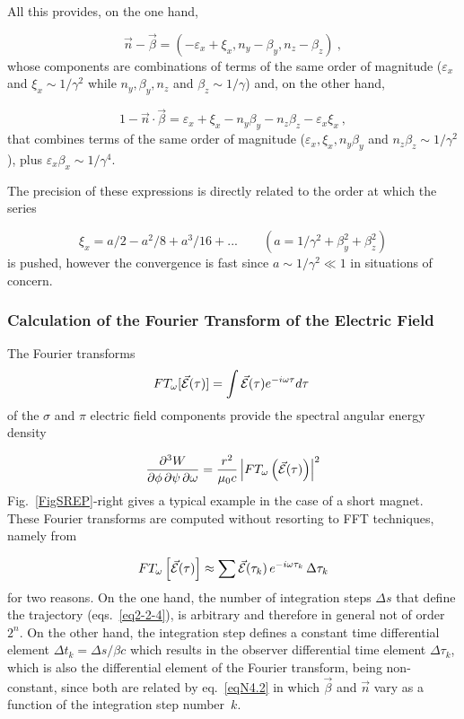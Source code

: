 \noindent All this provides, on the one hand, 

\begin{equation}
\vec{n} - \vec{\beta} = (-\varepsilon_x + \xi_x, n_y - \beta_y, n_z - \beta_z)~,  \label{eqN4.8}
\end{equation}   %
%
whose components are combinations of terms of the same order of magnitude
($\varepsilon_x$ and $\xi_x \sim 1/\gamma^2$ while $n_y, \beta_y, n_z$ and $\beta_z \sim
1/\gamma$) and, on the other hand,

\begin{equation}
1 - \vec{n} \cdot \vec{\beta} = \varepsilon_x + \xi_x - n_y\beta_y - n_z\beta_z -  \label{eqN4.9}
\varepsilon_x\xi_x~,
\end{equation}  %
%
that combines terms of the same order of magnitude ($\varepsilon_x, \xi_x, n_y\beta_y$
and $n_z\beta_z \sim 1/\gamma^2$), plus $\varepsilon_x\beta_x \sim 1/\gamma^4$.

\noindent The precision of these expressions is
directly related to the order at which the series

$$
	\xi_x = a/2 - a^2/8 + a^3/16 +... \qquad(a = 1/\gamma^2 + \beta_y^2 +\beta^2_z)
	$$
is pushed, however the convergence is   fast since $ a \sim 1/\gamma^2 \ll 1$ in situations of concern. 

\subsubsection{Calculation of the Fourier Transform of the Electric Field}\label{secN4.2}

The Fourier transforms
$$
	FT_\omega  [ \vec {\mathcal{E}} (\tau)] = \int \vec {\mathcal{E}}  (\tau) e^{-i\omega\tau} d\tau~$$
of the $\sigma$ and $\pi$ electric field components provide the spectral angular
 energy density 

\begin{equation}
     \dfrac{\partial^3 W}{\partial\phi\, \partial\psi\, \partial\omega} 
		= \dfrac{ r^2 }{ \mu_0 c}
            \left| FT_\omega \left(\vec  {\mathcal{E}} (\tau) \right)  \right|^2  \label{eqN4.10}
\end{equation}  %
%
Fig.~\ref{FigSREP}-right gives a typical example in the case of a short magnet. 
These  Fourier transforms are computed without resorting to  FFT techniques, namely from 

\begin{equation}
	FT_\omega \left[ \vec {\mathcal{E}}  (\tau) \right] 
		\approx \sum \vec {\mathcal{E}} (\tau_k)\, e^{-i\omega\tau_k} \, \Delta\tau_k  \label{eqN4.11}
\end{equation}    %
%
for two reasons. On the one hand, the number of integration steps $\Delta s$ that define the
trajectory (eqs.~\ref{eq2-2-4}), is arbitrary and therefore in general not of order $2^n$.
On the other hand, the integration step defines a constant time differential element 
$\Delta t_k = \Delta s/ \beta c$ which results in the observer differential time 
element $ \Delta \tau_k$, which is
also the differential element of the Fourier transform, being non-constant, since both
are related by eq.~\ref{eqN4.2} in which $\vec{\beta}$ and $\vec{n}$ 
vary as a function of the  integration step number~$k$.


